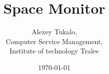 \documentclass[english]{article}
\date{}
\begin{document}
\title{\vspace{2in}Space Monitor}

\nopagebreak
\maketitle


\vspace{2.5in}

\author{
\begin{flushright}
Alexey Tukalo,\\
Computer Service Management,\\
Institute of technology Tralee
\end{flushright}
}

\date{\today}
\thispagestyle{empty}

\newpage
\setcounter{page}{1}
\setcounter{tocdepth}{2}
\tableofcontents

\newpage
\end{document}
